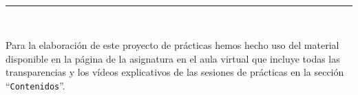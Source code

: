  \begin{center}
	{\fboxrule=4pt } \\
	\rule{15cm}{0pt} \\
\end{center}
\par Para la elaboración de este proyecto de prácticas hemos hecho uso del material disponible en la página de la asignatura en el aula virtual que incluye todas las transparencias y los vídeos explicativos de las sesiones de prácticas en la sección ``\texttt{Contenidos}''.


